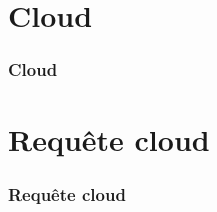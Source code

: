 \documentclass[12pt]{beamer}
\begin{document}
	\section{Cloud}
	
		\begin{frame}
				
			\frametitle{Cloud}
					
		\end{frame}	


	\section{Requête cloud}
	
		\begin{frame}
				
			\frametitle{Requête cloud}
					
		\end{frame}				
										
\end{document}
